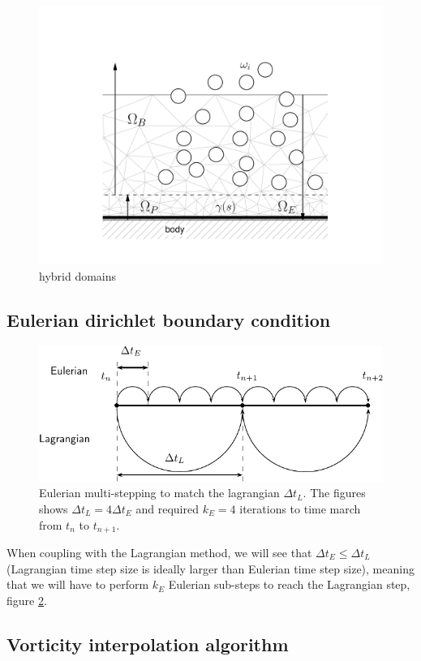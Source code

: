	\begin{figure}[t]
	\centering
	\includegraphics[width=0.7\linewidth]{./figures/hybrid/interpolation/hybrid_domains.pdf}
	\caption{hybrid domains}
	\label{fig:hybrid_domains}
	\end{figure}


\subsection{Eulerian dirichlet boundary condition}

	
	\begin{figure}[t]
	\centering
	\includegraphics[width=0.7\linewidth]{./figures/eulerian/multiStep-crop.pdf}
	\caption{Eulerian multi-stepping to match the lagrangian $\Delta t_L$. The figures shows $\Delta t_L = 4 \Delta t_E$ and required $k_E = 4$ iterations to time march from $t_n$ to $t_{n+1}$.}
	\label{fig:multiStep}
	\end{figure}	


When coupling with the Lagrangian method, we will see that $\Delta t_E \leqslant \Delta t_L$ (Lagrangian time step size is ideally larger than Eulerian time step size), meaning that we will have to perform $k_E$ Eulerian sub-steps to reach the Lagrangian step, figure \ref{fig:multiStep}.

\subsection{Vorticity interpolation algorithm}

